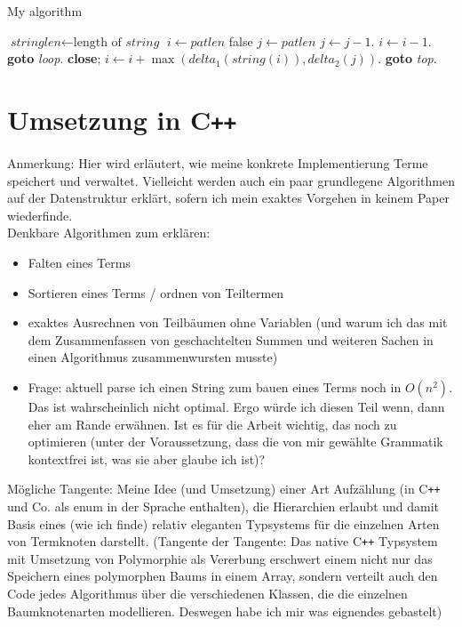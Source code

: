 \documentclass{article}
\begin{document}
\begin{algorithm}
\caption{My algorithm}\label{euclid}
\begin{algorithmic}[1]
\State $\textit{stringlen} \gets \text{length of }\textit{string}$
\State $i \gets \textit{patlen}$
 \Return false
\EndIf
\State $j \gets \textit{patlen}$
\State $j \gets j-1$.
\State $i \gets i-1$.
\State \textbf{goto} \emph{loop}.
\State \textbf{close};
\EndIf
\State $i \gets i+\max(\textit{delta}_1(\textit{string}(i)),\textit{delta}_2(j))$.
\State \textbf{goto} \emph{top}.
\end{algorithmic}
\end{algorithm}

\section{Umsetzung in C\texttt{++}}
\begin{itshape}
Anmerkung: Hier wird erläutert, wie meine konkrete Implementierung Terme speichert und verwaltet. Vielleicht werden auch ein paar grundlegene Algorithmen auf der Datenstruktur erklärt, sofern ich mein exaktes Vorgehen in keinem Paper wiederfinde.\\
Denkbare Algorithmen zum erklären:
\begin{itemize}
    \item Falten eines Terms
    \item Sortieren eines Terms / ordnen von Teiltermen
    \item exaktes Ausrechnen von Teilbäumen ohne Variablen (und warum ich das mit dem Zusammenfassen von geschachtelten Summen und weiteren Sachen in einen Algorithmus zusammenwursten musste)
    \item Frage: aktuell parse ich einen String zum bauen eines Terms noch in $O(n^2)$. Das ist wahrscheinlich nicht optimal. Ergo würde ich diesen Teil wenn, dann eher am Rande erwähnen. Ist es für die Arbeit wichtig, das noch zu optimieren (unter der Voraussetzung, dass die von mir gewählte Grammatik kontextfrei ist, was sie aber glaube ich ist)?
\end{itemize}

Mögliche Tangente: Meine Idee (und Umsetzung) einer Art Aufzählung (in C\texttt{++} und Co. als enum in der Sprache enthalten), die Hierarchien erlaubt und damit Basis eines (wie ich finde) relativ eleganten Typsystems für die einzelnen Arten von Termknoten darstellt. (Tangente der Tangente: Das native C\texttt{++} Typsystem mit Umsetzung von Polymorphie als Vererbung erschwert einem nicht nur das Speichern eines polymorphen Baums in einem Array, sondern verteilt auch den Code jedes Algorithmus über die verschiedenen Klassen, die die einzelnen Baumknotenarten modellieren. Deswegen habe ich mir was eignendes gebastelt)
\end{itshape}
\end{document}
